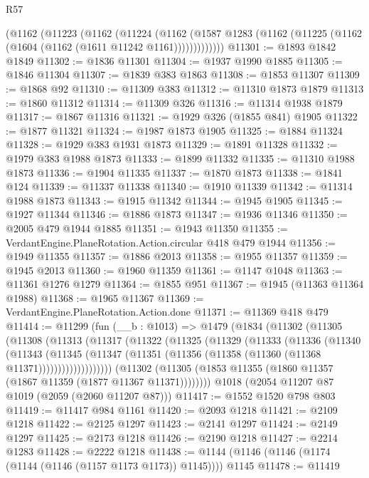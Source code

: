 \begin{lexlean}{R57}
\begin{coremodule}
      (@1162
        (@11223
          (@1162
            (@11224
              (@1162
                (@1587 @1283 (@1162 (@11225 (@1162 (@1604 (@1162 (@1611 @11242 @1161)))))))))))))
@11301 := @1893 @1842 @1849
@11302 := @1836 @11301
@11304 := @1937 @1990 @1885
@11305 := @1846 @11304
@11307 := @1839 @383 @1863
@11308 := @1853 @11307
@11309 := @1868 @92
@11310 := @11309 @383
@11312 := @11310 @1873 @1879
@11313 := @1860 @11312
@11314 := @11309 @326
@11316 := @11314 @1938 @1879
@11317 := @1867 @11316
@11321 := @1929 @326 (@1855 @841) @1905
@11322 := @1877 @11321
@11324 := @1987 @1873 @1905
@11325 := @1884 @11324
@11328 := @1929 @383 @1931 @1873
@11329 := @1891 @11328
@11332 := @1979 @383 @1988 @1873
@11333 := @1899 @11332
@11335 := @11310 @1988 @1873
@11336 := @1904 @11335
@11337 := @1870 @1873
@11338 := @1841 @124
@11339 := @11337 @11338
@11340 := @1910 @11339
@11342 := @11314 @1988 @1873
@11343 := @1915 @11342
@11344 := @1945 @1905
@11345 := @1927 @11344
@11346 := @1886 @1873
@11347 := @1936 @11346
@11350 := @2005 @479 @1944 @1885
@11351 := @1943 @11350
@11355 := VerdantEngine.PlaneRotation.Action.circular @418 @479 @1944
@11356 := @1949 @11355
@11357 := @1886 @2013
@11358 := @1955 @11357
@11359 := @1945 @2013
@11360 := @1960 @11359
@11361 := @1147 @1048
@11363 := @11361 @1276 @1279
@11364 := @1855 @951
@11367 := @1945 (@11363 @11364 @1988)
@11368 := @1965 @11367
@11369 := VerdantEngine.PlaneRotation.Action.done
@11371 := @11369 @418 @479
@11414 := @11299
    (fun (__b : @1013) =>
    @1479
      (@1834
        (@11302
          (@11305
            (@11308
              (@11313
                (@11317
                  (@11322
                    (@11325
                      (@11329
                        (@11333
                          (@11336
                            (@11340
                              (@11343
                                (@11345
                                  (@11347
                                    (@11351
                                      (@11356 (@11358 (@11360 (@11368 @11371)))))))))))))))))))
        (@11302 (@11305 (@1853 @11355 (@1860 @11357 (@1867 @11359 (@1877 @11367 @11371))))))))
    @1018
    (@2054 @11207 @87 @1019 (@2059 (@2060 @11207 @87)))
@11417 := @1552 @1520 @798 @803
@11419 := @11417 @984 @1161
@11420 := @2093 @1218
@11421 := @2109 @1218
@11422 := @2125 @1297
@11423 := @2141 @1297
@11424 := @2149 @1297
@11425 := @2173 @1218
@11426 := @2190 @1218
@11427 := @2214 @1283
@11428 := @2222 @1218
@11438 := @1144 (@1146 (@1146 (@1174 (@1144 (@1146 (@1157 @1173 @1173)) @1145)))) @1145
@11478 := @11419

\end{coremodule}
\end{lexlean}
